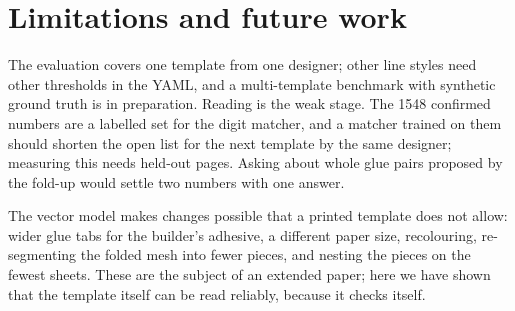 \section{Limitations and future work}

The evaluation covers one template from one designer; other
line styles need other thresholds in the YAML, and a multi-template benchmark with synthetic
ground truth is in preparation. Reading is the weak stage. The 1548 confirmed numbers are a
labelled set for the digit matcher, and a matcher trained on them should shorten the open list
for the next template by the same designer; measuring this needs held-out pages. Asking
about whole glue pairs proposed by the fold-up would settle two numbers with one answer.

The vector model makes changes possible that a printed template does not allow: wider glue
tabs for the builder's adhesive, a different paper size, recolouring, re-segmenting the folded
mesh into fewer pieces, and nesting the pieces on the fewest sheets. These are the subject of
an extended paper; here we have shown that the template itself can be read reliably, because
it checks itself.
